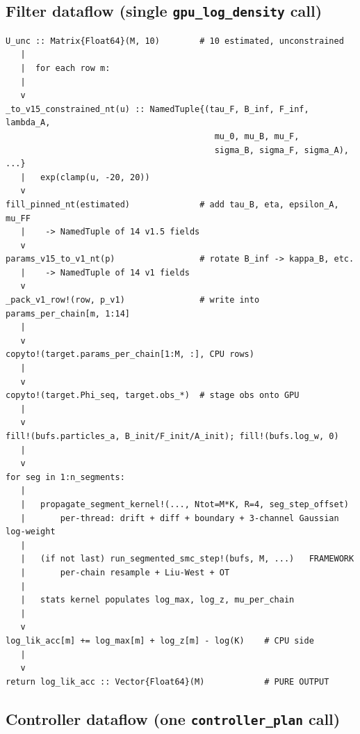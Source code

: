 \documentclass[11pt,a4paper]{article}
\begin{document}
\subsection{Filter dataflow (single \texttt{gpu\_log\_density} call)}

\begin{verbatim}
U_unc :: Matrix{Float64}(M, 10)        # 10 estimated, unconstrained
   |
   |  for each row m:
   |
   v
_to_v15_constrained_nt(u) :: NamedTuple{(tau_F, B_inf, F_inf, lambda_A,
                                          mu_0, mu_B, mu_F,
                                          sigma_B, sigma_F, sigma_A), ...}
   |   exp(clamp(u, -20, 20))
   v
fill_pinned_nt(estimated)              # add tau_B, eta, epsilon_A, mu_FF
   |    -> NamedTuple of 14 v1.5 fields
   v
params_v15_to_v1_nt(p)                 # rotate B_inf -> kappa_B, etc.
   |    -> NamedTuple of 14 v1 fields
   v
_pack_v1_row!(row, p_v1)               # write into params_per_chain[m, 1:14]
   |
   v
copyto!(target.params_per_chain[1:M, :], CPU rows)
   |
   v
copyto!(target.Phi_seq, target.obs_*)  # stage obs onto GPU
   |
   v
fill!(bufs.particles_a, B_init/F_init/A_init); fill!(bufs.log_w, 0)
   |
   v
for seg in 1:n_segments:
   |
   |   propagate_segment_kernel!(..., Ntot=M*K, R=4, seg_step_offset)
   |       per-thread: drift + diff + boundary + 3-channel Gaussian log-weight
   |
   |   (if not last) run_segmented_smc_step!(bufs, M, ...)   FRAMEWORK
   |       per-chain resample + Liu-West + OT
   |
   |   stats kernel populates log_max, log_z, mu_per_chain
   |
   v
log_lik_acc[m] += log_max[m] + log_z[m] - log(K)    # CPU side
   |
   v
return log_lik_acc :: Vector{Float64}(M)            # PURE OUTPUT
\end{verbatim}

\subsection{Controller dataflow (one \texttt{controller\_plan} call)}
\end{document}
